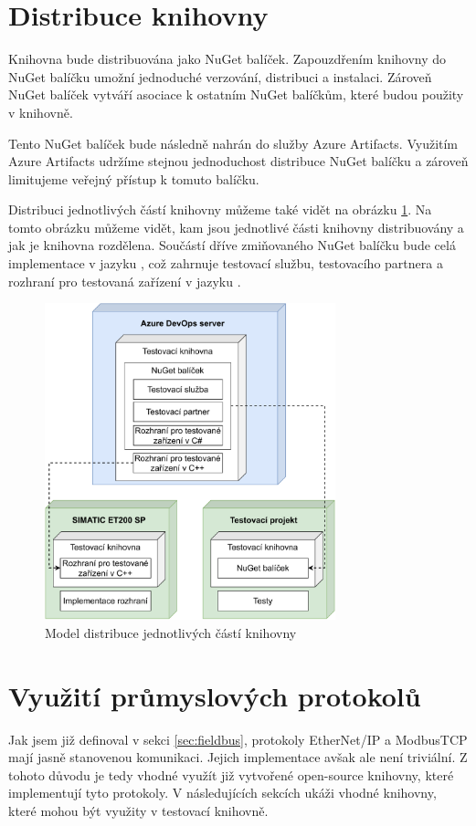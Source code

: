 \section{Distribuce knihovny}

Knihovna bude distribuována jako NuGet balíček. Zapouzdřením knihovny do NuGet balíčku umožní jednoduché verzování, distribuci a instalaci. Zároveň NuGet balíček vytváří asociace k ostatním NuGet balíčkům, které budou použity v knihovně.

Tento NuGet balíček bude následně nahrán do služby Azure Artifacts. Využitím Azure Artifacts udržíme stejnou jednoduchost distribuce NuGet balíčku a zároveň limitujeme veřejný přístup k tomuto balíčku. 

Distribuci jednotlivých částí knihovny můžeme také vidět na obrázku \ref{fig:deploymodel}. Na tomto obrázku můžeme vidět, kam jsou jednotlivé části knihovny distribuovány a jak je knihovna rozdělena. Součástí dříve zmiňovaného NuGet balíčku bude celá implementace v jazyku \csharp{}, což zahrnuje testovací službu, testovacího partnera a rozhraní pro testovaná zařízení v jazyku \csharp{}. 

\begin{figure}[htbp]
    \centering 
    \includegraphics[width=0.75\textwidth]{assets/img/deploymentmodel.pdf}
    \caption{Model distribuce jednotlivých částí knihovny}
    \label{fig:deploymodel}
\end{figure}


\section{Využití průmyslových protokolů}
Jak jsem již definoval v sekci \ref{sec:fieldbus}, protokoly EtherNet/IP a ModbusTCP mají jasně stanovenou komunikaci. Jejich implementace avšak ale není triviální. Z tohoto důvodu je tedy vhodné využít již vytvořené open-source knihovny, které implementují tyto protokoly. V následujících sekcích ukáži vhodné knihovny, které mohou být využity v testovací knihovně.

